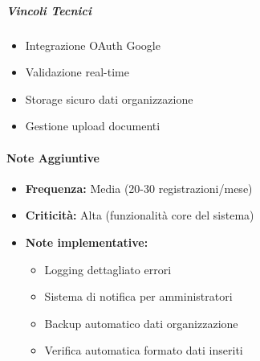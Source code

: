 \subparagraph{Vincoli Tecnici}
\begin{itemize}
\item Integrazione OAuth Google
\item Validazione real-time
\item Storage sicuro dati organizzazione
\item Gestione upload documenti
\end{itemize}

\paragraph{Note Aggiuntive}
\begin{itemize}
\item \textbf{Frequenza:} Media (20-30 registrazioni/mese)
\item \textbf{Criticità:} Alta (funzionalità core del sistema)
\item \textbf{Note implementative:}
    \begin{itemize}
        \item Logging dettagliato errori
        \item Sistema di notifica per amministratori
        \item Backup automatico dati organizzazione
        \item Verifica automatica formato dati inseriti
    \end{itemize}
\end{itemize}